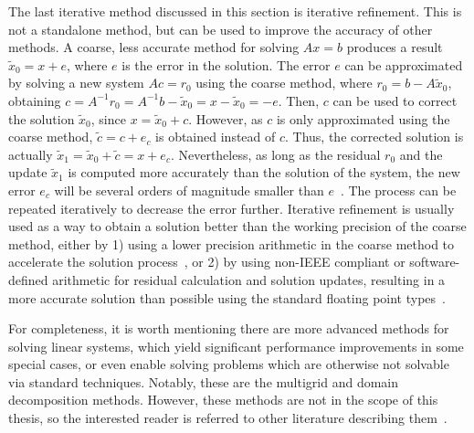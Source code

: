 The last iterative method discussed in this section is iterative refinement.
This is not a standalone method, but can be used to improve the accuracy
of other methods. A coarse, less accurate method for solving $Ax = b$ produces a
result $\tilde{x}_0 = x + e$, where $e$ is the error in the solution.  The error
$e$ can be approximated by solving a new system $Ac = r_0$ using the coarse
method, where $r_0 = b - A\tilde{x}_0$, obtaining $c = A^{-1}r_0 = A^{-1}b -
\tilde{x}_0 = x - \tilde{x}_0 = -e$. Then, $c$ can be used to correct the
solution $\tilde{x}_0$, since $x = \tilde{x}_0 + c$. However, as $c$ is only
approximated using the coarse method, $\tilde{c} = c + e_c$ is obtained instead
of $c$. Thus, the corrected solution is actually $\tilde{x}_1 = \tilde{x}_0 +
\tilde{c} = x + e_c$. Nevertheless, as long as the residual $r_0$ and the update
$\tilde{x}_1$ is computed more accurately than the solution of the system, the
new error $e_c$ will be several orders of magnitude smaller than
$e$~\cite{demmel,saad}. The process can be repeated iteratively to decrease the
error further. Iterative refinement is usually used as a way to obtain a
solution better than the working precision of the coarse method, either by 1)
using a lower precision arithmetic in the coarse method to accelerate the
solution process~\cite{higham-ir,anzt-ir}, or 2) by using non-IEEE compliant or
software-defined arithmetic for residual calculation and solution updates,
resulting in a more accurate solution than possible using the standard floating
point types~\cite{demmel}.

For completeness, it is worth mentioning there are more advanced methods for
solving linear systems, which yield significant performance improvements in some
special cases, or even enable solving problems which are otherwise not solvable
via standard techniques. Notably, these are the multigrid and domain
decomposition methods. However, these methods are not in the scope of this
thesis, so the interested reader is referred to other literature describing
them~\cite{demmel,saad}.
